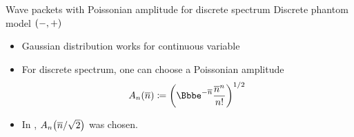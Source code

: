 \documentclass[9pt]{beamer}
\begin{document}
\begin{frame}%
{Wave packets with Poissonian amplitude for discrete spectrum}%
{Discrete phantom model ${\left(-,+\right)}$}
\begin{itemize}
\item Gaussian distribution works for continuous variable

\item For discrete spectrum, one can choose a Poissonian amplitude
\begin{align}
\rfun{A_n}{\overline{n}} \coloneqq
\rbr{\ee^{-\overline{n}}\frac{\overline{n}^n}{n!}}^{1/2}
\end{align}
\item In ,
${A_n}\mathopen{}\left(\overline{n}/\sqrt{2}\right)\mathclose{}$ was chosen.

\end{itemize}
\end{frame}
\end{document}
